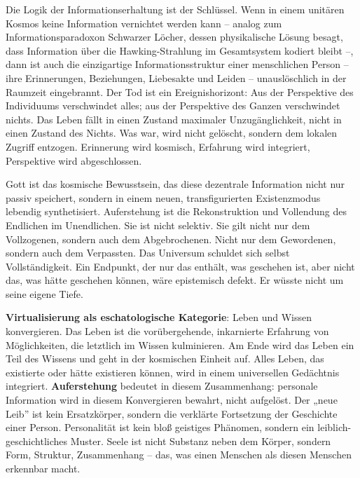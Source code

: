 \documentclass[
  ngerman,
]{article}
\begin{document}
Die Logik der Informationserhaltung ist der Schlüssel. Wenn in einem
unitären Kosmos keine Information vernichtet werden kann -- analog zum
Informationsparadoxon Schwarzer Löcher, dessen physikalische Lösung
besagt, dass Information über die Hawking-Strahlung im Gesamtsystem
kodiert bleibt --, dann ist auch die einzigartige Informationsstruktur
einer menschlichen Person -- ihre Erinnerungen, Beziehungen, Liebesakte
und Leiden -- unauslöschlich in der Raumzeit eingebrannt. Der Tod ist
ein Ereignishorizont: Aus der Perspektive des Individuums verschwindet
alles; aus der Perspektive des Ganzen verschwindet nichts. Das Leben
fällt in einen Zustand maximaler Unzugänglichkeit, nicht in einen
Zustand des Nichts. Was war, wird nicht gelöscht, sondern dem lokalen
Zugriff entzogen. Erinnerung wird kosmisch, Erfahrung wird integriert,
Perspektive wird abgeschlossen.

Gott ist das kosmische Bewusstsein, das diese dezentrale Information
nicht nur passiv speichert, sondern in einem neuen, transfigurierten
Existenzmodus lebendig synthetisiert. Auferstehung ist die
Rekonstruktion und Vollendung des Endlichen im Unendlichen. Sie ist
nicht selektiv. Sie gilt nicht nur dem Vollzogenen, sondern auch dem
Abgebrochenen. Nicht nur dem Gewordenen, sondern auch dem Verpassten.
Das Universum schuldet sich selbst Vollständigkeit. Ein Endpunkt, der
nur das enthält, was geschehen ist, aber nicht das, was hätte geschehen
können, wäre epistemisch defekt. Er wüsste nicht um seine eigene Tiefe.

\textbf{Virtualisierung als eschatologische Kategorie}: Leben und Wissen
konvergieren. Das Leben ist die vorübergehende, inkarnierte Erfahrung
von Möglichkeiten, die letztlich im Wissen kulminieren. Am Ende wird das
Leben ein Teil des Wissens und geht in der kosmischen Einheit auf. Alles
Leben, das existierte oder hätte existieren können, wird in einem
universellen Gedächtnis integriert. \textbf{Auferstehung} bedeutet in
diesem Zusammenhang: personale Information wird in diesem Konvergieren
bewahrt, nicht aufgelöst. Der „neue Leib'' ist kein Ersatzkörper,
sondern die verklärte Fortsetzung der Geschichte einer Person.
Personalität ist kein bloß geistiges Phänomen, sondern ein
leiblich-geschichtliches Muster. Seele ist nicht Substanz neben dem
Körper, sondern Form, Struktur, Zusammenhang -- das, was einen Menschen
als diesen Menschen erkennbar macht.
\end{document}
